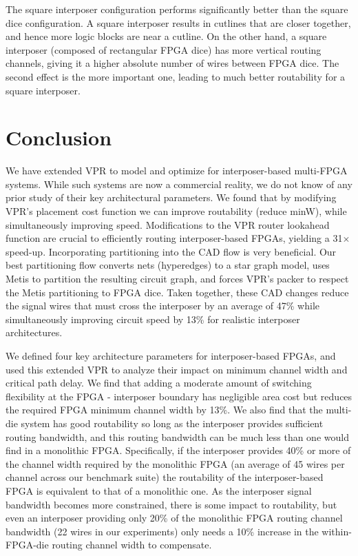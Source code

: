 \documentclass[journal]{IEEEtran}
\begin{document}
The square interposer configuration performs significantly better than the square dice configuration. A square interposer results in cutlines that are closer together, and hence more logic blocks are near a cutline. On the other hand, a square interposer (composed of rectangular FPGA dice) has more vertical routing channels, giving it a higher absolute number of wires between FPGA dice. The second effect is the more important one, leading to much better routability for a square interposer.

\section{Conclusion}
\label{conclusionSection}
We have extended VPR to model and optimize for interposer-based multi-FPGA systems. While such systems are now a commercial reality, we do not know of any prior study of their key architectural parameters. We found that by modifying VPR's placement cost function we can improve routability (reduce minW), while simultaneously improving speed. Modifications to the VPR router lookahead function are crucial to efficiently routing interposer-based FPGAs, yielding a 31$\times$ speed-up. Incorporating partitioning into the CAD flow is very beneficial. Our best partitioning flow converts nets (hyperedges) to a star graph model, uses Metis to partition the resulting circuit graph, and forces VPR's packer to respect the Metis partitioning to FPGA dice. Taken together, these CAD changes reduce the signal wires that must cross the interposer by an average of 47\% while simultaneously improving circuit speed by 13\% for realistic interposer architectures.

We defined four key architecture parameters for interposer-based FPGAs, and used this extended VPR to analyze their impact on minimum channel width and critical path delay. We find that adding a moderate amount of switching flexibility at the FPGA - interposer boundary has negligible area cost but reduces the required FPGA minimum channel width by 13\%. We also find that the multi-die system has good routability so long as the interposer provides sufficient routing bandwidth, and this routing bandwidth can be much less than one would find in a monolithic FPGA. Specifically, if the interposer provides 40\% or more of the channel width required by the monolithic FPGA (an average of 45 wires per channel across our benchmark suite) the routability of the interposer-based FPGA is equivalent to that of a monolithic one. As the interposer signal bandwidth becomes more constrained, there is some impact to routability, but even an interposer providing only 20\% of the monolithic FPGA routing channel bandwidth (22 wires in our experiments) only needs a 10\% increase in the within-FPGA-die routing channel width to compensate.
\end{document}
